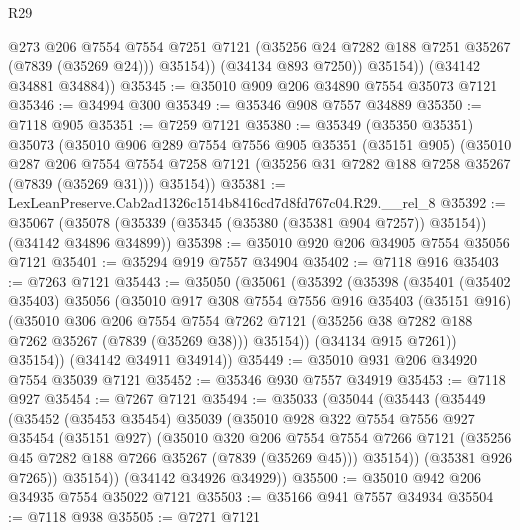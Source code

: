 \begin{lexlean}{R29}
\begin{coremodule}
                @273
                @206
                @7554
                @7554
                @7251
                @7121
                (@35256 @24 @7282 @188 @7251 @35267 (@7839 (@35269 @24)))
                @35154))
            (@34134 @893 @7250))
          @35154))
      (@34142 @34881 @34884))
@35345 := @35010 @909 @206 @34890 @7554 @35073 @7121
@35346 := @34994 @300
@35349 := @35346 @908 @7557 @34889
@35350 := @7118 @905
@35351 := @7259 @7121
@35380 := @35349
    (@35350 @35351)
    @35073
    (@35010
      @906
      @289
      @7554
      @7556
      @905
      @35351
      (@35151 @905)
      (@35010
        @287
        @206
        @7554
        @7554
        @7258
        @7121
        (@35256 @31 @7282 @188 @7258 @35267 (@7839 (@35269 @31)))
        @35154))
@35381 := LexLeanPreserve.Cab2ad1326c1514b8416cd7d8fd767c04.R29.__rel_8
@35392 := @35067
    (@35078 (@35339 (@35345 (@35380 (@35381 @904 @7257)) @35154)) (@34142 @34896 @34899))
@35398 := @35010 @920 @206 @34905 @7554 @35056 @7121
@35401 := @35294 @919 @7557 @34904
@35402 := @7118 @916
@35403 := @7263 @7121
@35443 := @35050
    (@35061
      (@35392
        (@35398
          (@35401
            (@35402 @35403)
            @35056
            (@35010
              @917
              @308
              @7554
              @7556
              @916
              @35403
              (@35151 @916)
              (@35010
                @306
                @206
                @7554
                @7554
                @7262
                @7121
                (@35256 @38 @7282 @188 @7262 @35267 (@7839 (@35269 @38)))
                @35154))
            (@34134 @915 @7261))
          @35154))
      (@34142 @34911 @34914))
@35449 := @35010 @931 @206 @34920 @7554 @35039 @7121
@35452 := @35346 @930 @7557 @34919
@35453 := @7118 @927
@35454 := @7267 @7121
@35494 := @35033
    (@35044
      (@35443
        (@35449
          (@35452
            (@35453 @35454)
            @35039
            (@35010
              @928
              @322
              @7554
              @7556
              @927
              @35454
              (@35151 @927)
              (@35010
                @320
                @206
                @7554
                @7554
                @7266
                @7121
                (@35256 @45 @7282 @188 @7266 @35267 (@7839 (@35269 @45)))
                @35154))
            (@35381 @926 @7265))
          @35154))
      (@34142 @34926 @34929))
@35500 := @35010 @942 @206 @34935 @7554 @35022 @7121
@35503 := @35166 @941 @7557 @34934
@35504 := @7118 @938
@35505 := @7271 @7121

\end{coremodule}
\end{lexlean}
